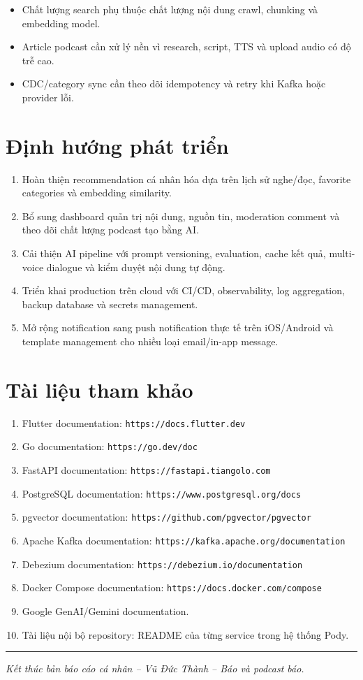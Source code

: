 \documentclass[14pt,a4paper,oneside]{extreport}
\begin{document}
\begin{itemize}[leftmargin=2cm]
  \item Chất lượng search phụ thuộc chất lượng nội dung crawl, chunking và embedding model.
  \item Article podcast cần xử lý nền vì research, script, TTS và upload audio có độ trễ cao.
  \item CDC/category sync cần theo dõi idempotency và retry khi Kafka hoặc provider lỗi.
\end{itemize}

\section{Định hướng phát triển}
\label{sec:dinh-huong}

\begin{enumerate}[leftmargin=2cm]
  \item Hoàn thiện recommendation cá nhân hóa dựa trên lịch sử nghe/đọc, favorite categories và embedding similarity.
  \item Bổ sung dashboard quản trị nội dung, nguồn tin, moderation comment và theo dõi chất lượng podcast tạo bằng AI.
  \item Cải thiện AI pipeline với prompt versioning, evaluation, cache kết quả, multi-voice dialogue và kiểm duyệt nội dung tự động.
  \item Triển khai production trên cloud với CI/CD, observability, log aggregation, backup database và secrets management.
  \item Mở rộng notification sang push notification thực tế trên iOS/Android và template management cho nhiều loại email/in-app message.
\end{enumerate}

\section{Tài liệu tham khảo}
\label{sec:tai-lieu-tham-khao}

\begin{enumerate}[leftmargin=2cm]
  \item Flutter documentation: \texttt{https://docs.flutter.dev}
  \item Go documentation: \texttt{https://go.dev/doc}
  \item FastAPI documentation: \texttt{https://fastapi.tiangolo.com}
  \item PostgreSQL documentation: \texttt{https://www.postgresql.org/docs}
  \item pgvector documentation: \texttt{https://github.com/pgvector/pgvector}
  \item Apache Kafka documentation: \texttt{https://kafka.apache.org/documentation}
  \item Debezium documentation: \texttt{https://debezium.io/documentation}
  \item Docker Compose documentation: \texttt{https://docs.docker.com/compose}
  \item Google GenAI/Gemini documentation.
  \item Tài liệu nội bộ repository: README của từng service trong hệ thống Pody.
\end{enumerate}

\vspace{1cm}
\noindent\rule{\textwidth}{0.4pt}

\noindent
\textit{Kết thúc bản báo cáo cá nhân -- Vũ Đức Thành -- Báo và podcast báo.}
\end{document}
